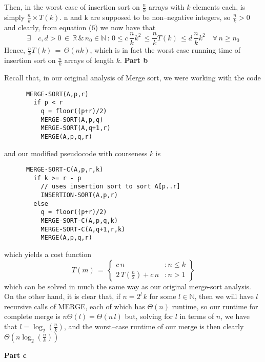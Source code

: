 \documentclass{article}
\begin{document}
    Then, in the worst case of insertion sort on $\frac{n}{k}$ arrays with $k$ elements each, is simply $\frac{n}{k} \times T(k) $.
    n and k are supposed to be non--negative integers, so $\frac{n}{k} > 0$ and
    clearly, from equation (6) we now have that
    \begin{equation}
      \exists \quad c,d  > 0\, \in\, \mathbb{R}\, \& \, n_0 \in \mathbb{N} \, : \,
      0 \leq c \, \frac{n}{k} k^2  \, \leq  \frac{n}{k} T(k) \, \leq d \, \frac{n}{k} k^2 \quad \forall \, n \geq n_0
    \end{equation}
    Hence, $\frac{n}{k} T(k) \, = \, \Theta(nk)$, which is in fact the worst case running time of insertion sort on $\frac{n}{k}$ arrays of length $k$.
  \newpage
  \textbf{Part b}

    Recall that, in our original analysis of Merge sort, we were working with the code

    \begin{verbatim}
      MERGE-SORT(A,p,r)
        if p < r
          q = floor((p+r)/2)
          MERGE-SORT(A,p,q)
          MERGE-SORT(A,q+1,r)
          MERGE(A,p,q,r)
    \end{verbatim}

    and our modified pseudocode with courseness $k$ is
    \begin{verbatim}
      MERGE-SORT-C(A,p,r,k)
        if k >= r - p
          // uses insertion sort to sort A[p..r]
          INSERTION-SORT(A,p,r)
        else
          q = floor((p+r)/2)
          MERGE-SORT-C(A,p,q,k)
          MERGE-SORT-C(A,q+1,r,k)
          MERGE(A,p,q,r)
    \end{verbatim}

    which yields a cost function
    $$
      T(m) \, = \, \left\{
      \begin{array}{lr}
        c\, n &: n \leq k \\
        2 \,T(\frac{n}{2})+ c \,n &:n > 1
      \end{array}
      \right\}
    $$
    which can be solved in much the same way as our original merge-sort analysis.
    On the other hand, it is clear that, if $ n = 2^l \, k$ for some $l \in \mathbb{N}$, then we will have $l$ recursive calls of MERGE, each of which has $\Theta(n)$ runtime, so our runtime for complete merge is $n\Theta(l) = \Theta(n \, l)$ but, solving for $l$ in terms of $n$, we have that $l = \log_{2}(\frac{n}{k})$, and the worst--case runtime of our merge is then clearly $\Theta(n \log_{2}(\frac{n}{k}))$

  \textbf{Part c}
\end{document}
